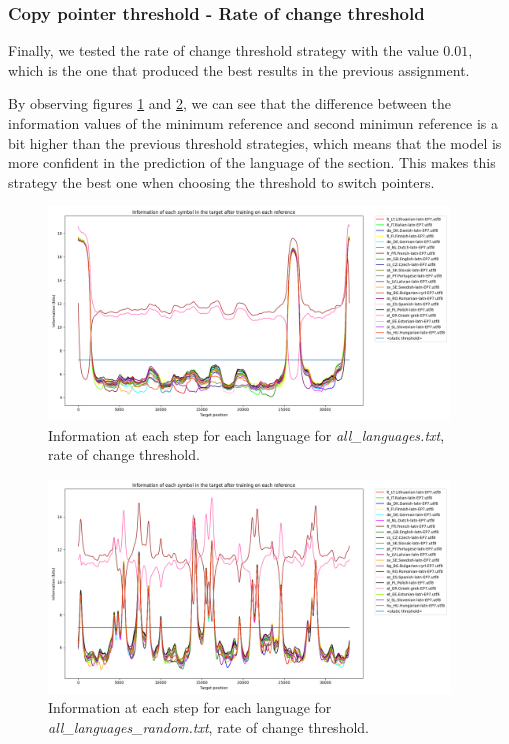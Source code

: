 \documentclass{article}
\begin{document}
\subsubsection{Copy pointer threshold - Rate of change threshold}
\label{subsubsec:results_locate_lang_rate_of_change_threshold}

Finally, we tested the rate of change threshold strategy with the value $0.01$, which is the one that produced the best results in the previous assignment.

By observing figures \ref{fig:all_languages_t_c} and \ref{fig:all_languages_random_t_c}, we can see that the difference between the information values of the minimum reference
and second minimun reference is a bit higher than the previous threshold strategies, which means that the model is more confident in the prediction of the language of the section.
This makes this strategy the best one when choosing the threshold to switch pointers.

\begin{figure}
    \centering
    \includegraphics[width=0.95\textwidth]{../results/all_languages/-t_c:0.01.png}
    \caption{Information at each step for each language for \textit{all\_languages.txt}, rate of change threshold.}
    \label{fig:all_languages_t_c}
\end{figure}

\begin{figure}
    \centering
    \includegraphics[width=0.95\textwidth]{../results/all_languages_random/-t_c:0.01.png}
    \caption{Information at each step for each language for \textit{all\_languages\_random.txt}, rate of change threshold.}
    \label{fig:all_languages_random_t_c}
\end{figure}
\end{document}
